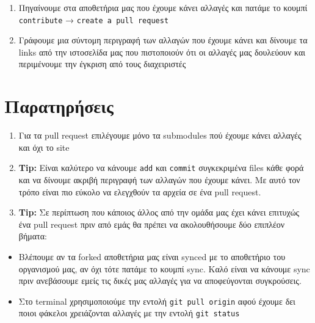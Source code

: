 \begin{enumerate}
\def\labelenumi{\arabic{enumi}.}
\tightlist
\item
  Πηγαίνουμε στα αποθετήρια μας που έχουμε κάνει αλλαγές και πατάμε το
  κουμπί \texttt{contribute} → \texttt{create\ a\ pull\ request}
\item
  Γράφουμε μια σύντομη περιγραφή των αλλαγών που έχουμε κάνει και
  δίνουμε τα links από την ιστοσελίδα μας που πιστοποιούν ότι οι αλλαγές
  μας δουλεύουν και περιμένουμε την έγκριση από τους διαχειριστές
\end{enumerate}

\hypertarget{ux3c0ux3b1ux3c1ux3b1ux3c4ux3b7ux3c1ux3aeux3c3ux3b5ux3b9ux3c2}{%
\section{Παρατηρήσεις}\label{ux3c0ux3b1ux3c1ux3b1ux3c4ux3b7ux3c1ux3aeux3c3ux3b5ux3b9ux3c2}}

\begin{enumerate}
\def\labelenumi{\arabic{enumi}.}
\tightlist
\item
  Για τα pull request επιλέγουμε μόνο τα submodules πού έχουμε κάνει
  αλλαγές και όχι το site
\item
  \textbf{Tip:} Είναι καλύτερο να κάνουμε \texttt{add} και
  \texttt{commit} συγκεκριμένα files κάθε φορά και να δίνουμε ακριβή
  περιγραφή των αλλαγών που έχουμε κάνει. Με αυτό τον τρόπο είναι πιο
  εύκολο να ελεγχθούν τα αρχεία σε ένα pull request.
\item
  \textbf{Tip:} Σε περίπτωση που κάποιος άλλος από την ομάδα μας έχει
  κάνει επιτυχώς ένα pull request πριν από εμάς θα πρέπει να
  ακολουθήσουμε δύο επιπλέον βήματα:
\end{enumerate}

\begin{itemize}
\tightlist
\item
  Βλέπουμε αν τα forked αποθετήρια μας είναι synced με το αποθετήριο του
  οργανισμού μας, αν όχι τότε πατάμε το κουμπί sync. Καλό είναι να
  κάνουμε sync πριν ανεβάσουμε εμείς τις δικές μας αλλαγές για να
  αποφεύγονται συγκρούσεις.
\item
  Στο terminal χρησιμοποιούμε την εντολή \texttt{git\ pull\ origin} αφού
  έχουμε δει ποιοι φάκελοι χρειάζονται αλλαγές με την εντολή
  \texttt{git\ status}
\end{itemize}
